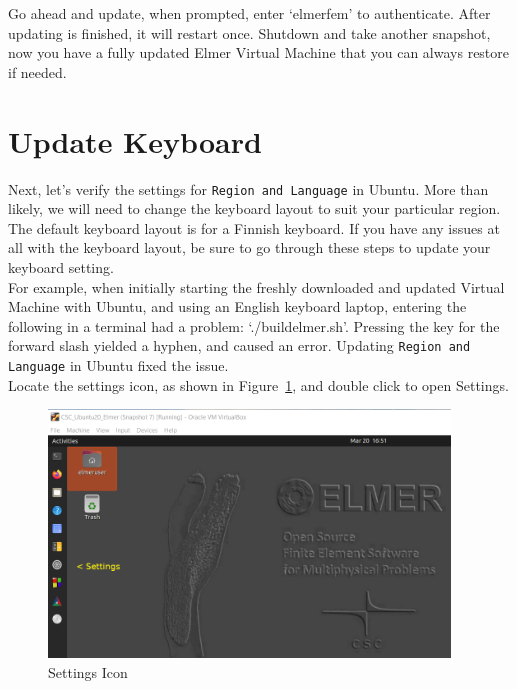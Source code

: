 Go ahead and update, when prompted, enter `elmerfem' to authenticate.  After updating is finished, it will restart once.  Shutdown and take another snapshot, now you have a fully updated Elmer Virtual Machine that you can always restore if needed.\\

\section{Update Keyboard}

Next, let's verify the settings for \texttt{Region and Language} in Ubuntu.  More than likely, we will need to change the keyboard layout to suit your particular region.  The default keyboard layout is for a Finnish keyboard.  If you have any issues at all with the keyboard layout, be sure to go through these steps to update your keyboard setting.\\

For example, when initially starting the freshly downloaded and updated Virtual Machine with Ubuntu, and using an English keyboard laptop, entering the following in a terminal had a problem:  `./buildelmer.sh'.  Pressing the key for the forward slash yielded a hyphen, and caused an error.  Updating \texttt{Region and Language} in Ubuntu fixed the issue.\\ 

Locate the settings icon, as shown in Figure~\ref{fg:virt-7}, and double click to open Settings.

\begin{figure}[H]
\begin{center}
\includegraphics[width=0.95\textwidth]{virt-7}
\caption{Settings Icon}\label{fg:virt-7}
\end{center}
\end{figure}

